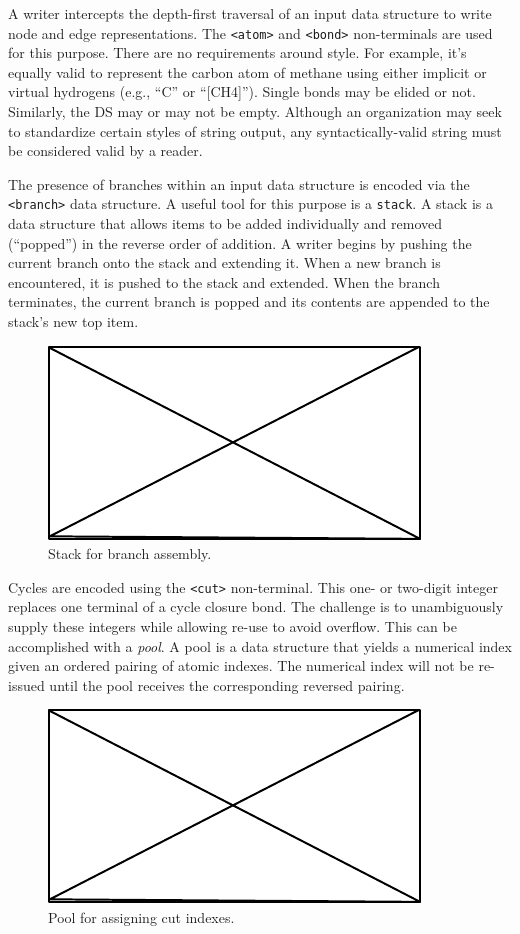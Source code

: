 \documentclass{article}
\def\ttt{\texttt}
\begin{document}
A writer intercepts the depth-first traversal of an input data structure to write node and edge representations. The \ttt{<atom>} and \ttt{<bond>} non-terminals are used for this purpose. There are no requirements around style. For example, it's equally valid to represent the carbon atom of methane using either implicit or virtual hydrogens (e.g., \enquote{C} or \enquote{[CH4]}). Single bonds may be elided or not. Similarly, the DS may or may not be empty. Although an organization may seek to standardize certain styles of string output, any syntactically-valid string must be considered valid by a reader.

The presence of branches within an input data structure is encoded via the \ttt{<branch>} data structure. A useful tool for this purpose is a \ttt{stack}. A stack is a data structure that allows items to be added individually and removed (\enquote{popped}) in the reverse order of addition. A writer begins by pushing the current branch onto the stack and extending it. When a new branch is encountered, it is pushed to the stack and extended. When the branch terminates, the current branch is popped and its contents are appended to the stack's new top item.

\begin{figure}
    \centering
    \includegraphics{filler}
    \caption{Stack for branch assembly.}
    \label{fig:branch-stack}
\end{figure}

Cycles are encoded using the \ttt{<cut>} non-terminal. This one- or two-digit integer replaces one terminal of a cycle closure bond. The challenge is to unambiguously supply these integers while allowing re-use to avoid overflow. This can be accomplished with a \textit{pool}. A pool is a data structure that yields a numerical index given an ordered pairing of atomic indexes. The numerical index will not be re-issued until the pool receives the corresponding reversed pairing.

\begin{figure}
    \centering
    \includegraphics{filler}
    \caption{Pool for assigning cut indexes.}
    \label{fig:pool}
\end{figure}
\end{document}
